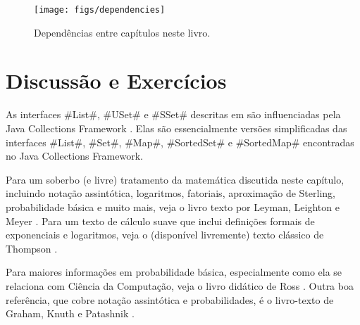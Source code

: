 \begin{figure}
  \begin{center}
    \texttt{[image: figs/dependencies]}
  \end{center}
  \caption{Dependências entre capítulos neste livro.}
\end{figure}

\section{Discussão e Exercícios}

As interfaces 
#List#, #USet# e #SSet# descritas em 
 são influenciadas pela Java Collections Framework
\cite{oracle_collections}.
%
Elas são essencialmente versões simplificadas das interfaces 
#List#, #Set#, #Map#, #SortedSet# e #SortedMap# encontradas no 
Java Collections Framework.  

Para um soberbo (e livre) tratamento da matemática discutida neste capítulo, incluindo notação assintótica, logaritmos, fatoriais, aproximação de Sterling, probabilidade básica e muito mais, veja o livro texto por
Leyman, Leighton e Meyer \cite{llm11}.  
Para um texto de cálculo suave que inclui definições formais de exponenciais e logaritmos, veja o (disponível livremente) texto clássico de Thompson \cite{t14}.

Para maiores informações em probabilidade básica, especialmente como ela se relaciona com Ciência da Computação, veja o livro didático de Ross \cite{r01}.  
Outra boa referência, que cobre notação assintótica e probabilidades, é o livro-texto de Graham, Knuth e Patashnik \cite{gkp94}.


